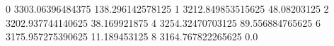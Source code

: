 0 3303.06396484375 138.296142578125
1 3212.849853515625 48.08203125
2 3202.937744140625 38.169921875
4 3254.32470703125 89.556884765625
6 3175.957275390625 11.189453125
8 3164.767822265625 0.0
